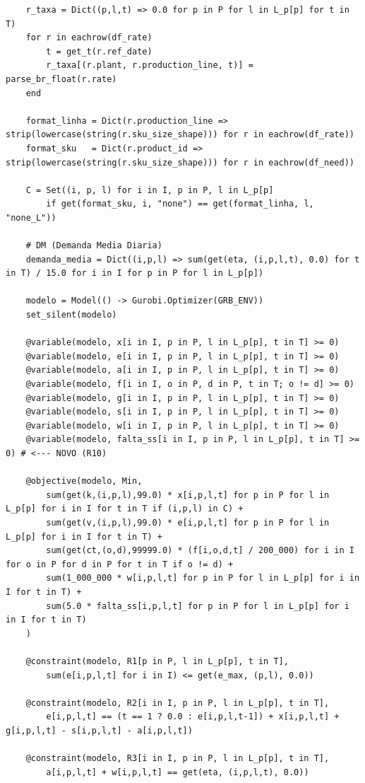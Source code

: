 \documentclass[12pt, a4paper]{article}
\begin{document}
\begin{mdframed}[style=codigo]
\begin{lstlisting}
    r_taxa = Dict((p,l,t) => 0.0 for p in P for l in L_p[p] for t in T)
    for r in eachrow(df_rate)
        t = get_t(r.ref_date)
        r_taxa[(r.plant, r.production_line, t)] = parse_br_float(r.rate)
    end
        
    format_linha = Dict(r.production_line => strip(lowercase(string(r.sku_size_shape))) for r in eachrow(df_rate))
    format_sku   = Dict(r.product_id => strip(lowercase(string(r.sku_size_shape))) for r in eachrow(df_need))

    C = Set((i, p, l) for i in I, p in P, l in L_p[p] 
        if get(format_sku, i, "none") == get(format_linha, l, "none_L"))

    # DM (Demanda Media Diaria)
    demanda_media = Dict((i,p,l) => sum(get(eta, (i,p,l,t), 0.0) for t in T) / 15.0 for i in I for p in P for l in L_p[p])

    modelo = Model(() -> Gurobi.Optimizer(GRB_ENV))
    set_silent(modelo)

    @variable(modelo, x[i in I, p in P, l in L_p[p], t in T] >= 0)
    @variable(modelo, e[i in I, p in P, l in L_p[p], t in T] >= 0)
    @variable(modelo, a[i in I, p in P, l in L_p[p], t in T] >= 0)
    @variable(modelo, f[i in I, o in P, d in P, t in T; o != d] >= 0)
    @variable(modelo, g[i in I, p in P, l in L_p[p], t in T] >= 0)
    @variable(modelo, s[i in I, p in P, l in L_p[p], t in T] >= 0)
    @variable(modelo, w[i in I, p in P, l in L_p[p], t in T] >= 0)
    @variable(modelo, falta_ss[i in I, p in P, l in L_p[p], t in T] >= 0) # <--- NOVO (R10)

    @objective(modelo, Min,
        sum(get(k,(i,p,l),99.0) * x[i,p,l,t] for p in P for l in L_p[p] for i in I for t in T if (i,p,l) in C) +
        sum(get(v,(i,p,l),99.0) * e[i,p,l,t] for p in P for l in L_p[p] for i in I for t in T) +
        sum(get(ct,(o,d),99999.0) * (f[i,o,d,t] / 200_000) for i in I for o in P for d in P for t in T if o != d) +
        sum(1_000_000 * w[i,p,l,t] for p in P for l in L_p[p] for i in I for t in T) +
        sum(5.0 * falta_ss[i,p,l,t] for p in P for l in L_p[p] for i in I for t in T)
    )

    @constraint(modelo, R1[p in P, l in L_p[p], t in T],
        sum(e[i,p,l,t] for i in I) <= get(e_max, (p,l), 0.0))

    @constraint(modelo, R2[i in I, p in P, l in L_p[p], t in T],
        e[i,p,l,t] == (t == 1 ? 0.0 : e[i,p,l,t-1]) + x[i,p,l,t] + g[i,p,l,t] - s[i,p,l,t] - a[i,p,l,t])

    @constraint(modelo, R3[i in I, p in P, l in L_p[p], t in T],
        a[i,p,l,t] + w[i,p,l,t] == get(eta, (i,p,l,t), 0.0))


\end{lstlisting}
\end{mdframed}
\end{document}
